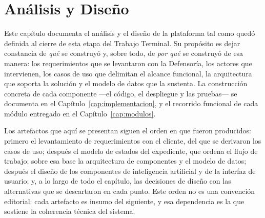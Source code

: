 \chapter{Análisis y Diseño}
	\label{cap:analisis_diseno}
	Este capítulo documenta el análisis y el diseño de la plataforma tal como quedó definida al
	cierre de esta etapa del Trabajo Terminal. Su propósito es dejar constancia de \emph{qué} se
	construyó y, sobre todo, de \emph{por qué} se construyó de esa manera: los requerimientos que
	se levantaron con la Defensoría, los actores que intervienen, los casos de uso que delimitan
	el alcance funcional, la arquitectura que soporta la solución y el modelo de datos que la
	sustenta. La construcción concreta de cada componente ---el código, el despliegue y las
	pruebas--- se documenta en el Capítulo~\ref{cap:implementacion}, y el recorrido funcional de
	cada módulo entregado en el Capítulo~\ref{cap:modulos}.
	
	Los artefactos que aquí se presentan siguen el orden en que fueron producidos: primero el
	levantamiento de requerimientos con el cliente, del que se derivaron los casos de uso; después
	el modelo de estados del expediente, que ordena el flujo de trabajo; sobre esa base la
	arquitectura de componentes y el modelo de datos; después el diseño de los componentes de
	inteligencia artificial y de la interfaz de usuario; y, a lo largo de todo el capítulo, las
	decisiones de diseño con las alternativas que se descartaron en cada punto. Este orden no es una convención editorial:
	cada artefacto es insumo del siguiente, y esa dependencia es la que sostiene la coherencia
	técnica del sistema.
	
